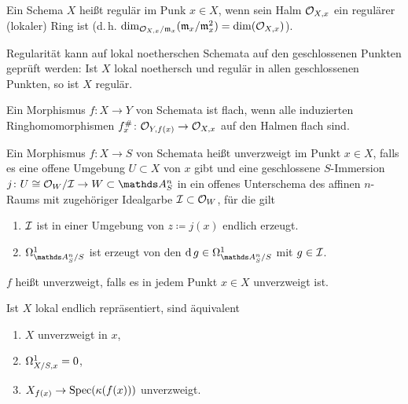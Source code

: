 \documentclass[german]{scrreprt}
\begin{document}
\begin{Definition}[Regulär]
Ein Schema $X$ heißt regulär im Punk $x\in X$, wenn sein Halm
$\mathcal{O}_{X,x}$ ein regulärer (lokaler) Ring ist
(d.\,h. $\dim_{\mathcal{O}_{X,x}/\mathfrak{m}_x}(\mathfrak{m}_x/\mathfrak{m}_x^2)=\dim(\mathcal{O}_{X,x})$).

Regularität kann auf lokal noetherschen Schemata auf den geschlossenen
Punkten geprüft werden:
Ist $X$ lokal noethersch und regulär in allen geschlossenen Punkten,
so ist $X$ regulär.
\cite[Remark 6.25 (3)]{wedhorn}
\end{Definition}

\begin{Definition}
Ein Morphismus $f\colon X\to Y$ von Schemata ist flach, wenn alle
induzierten Ringhomomorphismen $f_x^\#\colon \mathcal{O}_{Y,f(x)}\to\mathcal{O}_{X,x}$  auf
den Halmen flach sind.
\cite[]{bosch, goodreduction}
\end{Definition}

\begin{Definition}
  Ein Morphismus $f\colon X\to S$ von Schemata heißt unverzweigt im
  Punkt $x\in X$, falls es eine offene Umgebung
  $U\subset X$ von $x$ gibt und eine geschlossene $S$-Immersion
  $j\colon U\cong\O_W/\I\to W\subset\A_S^n$ in ein offenes Unterschema
  des affinen $n$-Raums mit zugehöriger Idealgarbe $\mathcal{I}\subset\mathcal{O}_W$,
  für die gilt
  \begin{enumerate}[label=(\alph*)]
  \item $\mathcal{I}$ ist in einer Umgebung von $z\coloneqq j(x)$ endlich erzeugt.
  \item $\Om{\A_S^n/S}$ ist erzeugt von den $\d g\in\Om{\A_S^n/S}$
    mit $g\in\mathcal{I}$.
  \end{enumerate}
  $f$ heißt unverzweigt, falls es in jedem Punkt $x\in X$
  unverzweigt ist.
  \begin{Bemerkung}
    Ist $X$ lokal endlich repräsentiert, sind äquivalent
    \begin{enumerate}[label=(\roman*)]
    \item $X$ unverzweigt in $x$,
    \item $\Omega_{X/S,x}^1=0$,
    \item $X_{f(x)}\to \operatorname{Spec}(\kappa(f(x)))$ unverzweigt.
    \end{enumerate}
    \cite[8.4, Theorem 3]{bosch}
  \end{Bemerkung}
\end{Definition}
\end{document}
